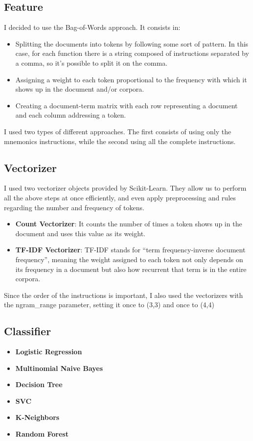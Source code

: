 \documentclass[11pt]{article}
\begin{document}
\subsection{Feature}
I decided to use the Bag-of-Words approach. It consists in:
\begin{itemize}
	\item Splitting the documents into tokens by following some sort of pattern. In this case, for each function there is a string composed of instructions separated by a comma, so it's possible to split it on the comma.
	\item Assigning a weight to each token proportional to the frequency with which it shows up in the document and/or corpora.
	\item Creating a document-term matrix with each row representing a document and each column addressing a token.
\end{itemize}
I used two types of different approaches. The first consists of using only the mnemonics instructions, while the second using all the complete instructions.

\subsection{Vectorizer}
I used two vectorizer objects provided by Scikit-Learn. They allow us to perform all the above steps at once efficiently, and even apply preprocessing and rules regarding the number and frequency of tokens.

\begin{itemize}
	\item \textbf{Count Vectorizer}: It counts the number of times a token shows up in the document and uses this value as its weight.
	\item \textbf{TF-IDF Vectorizer}: TF-IDF stands for “term frequency-inverse document frequency”, meaning the weight assigned to each token not only depends on its frequency in a document but also how recurrent that term is in the entire corpora.
\end{itemize}

Since the order of the instructions is important, I also used the vectorizers with the ngram\_range parameter, setting it once to (3,3) and once to (4,4)

\subsection{Classifier}
\begin{itemize}
	\item \textbf{Logistic Regression}
	\item \textbf{Multinomial Naive Bayes}
	\item \textbf{Decision Tree}
	\item \textbf{SVC}
	\item \textbf{K-Neighbors}
	\item \textbf{Random Forest}
\end{itemize}
\end{document}
